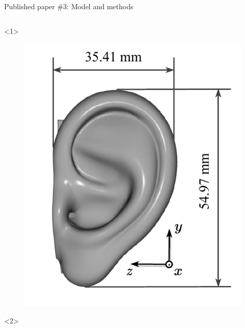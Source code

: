 \documentclass[xcolor=dvipsnames,10pt]{beamer}
\begin{document}
\begin{frame}{Published paper \#3: Model and methods}
    \begin{columns}[c]
        \begin{column}{0.4\textwidth}
            \begin{onlyenv}<1>
                \begin{center}
                \begin{figure}
                    \includegraphics[width=\textwidth]{artwork/IEEE-JERM-ear.pdf}
                \end{figure}
                \end{center}
            \end{onlyenv}
            \begin{onlyenv}<2>
                \begin{center}
                \begin{figure}

\end{figure}
\end{center}
\end{onlyenv}
\end{column}
\end{columns}
\end{frame}
\end{document}
